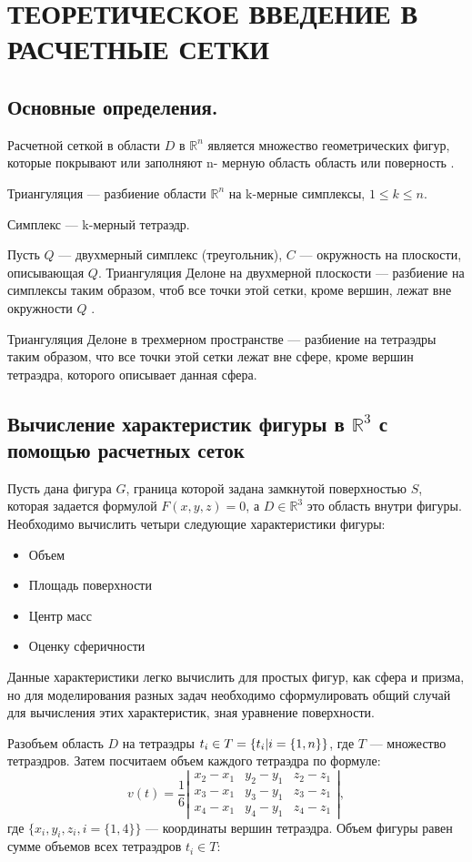 \chapter{ТЕОРЕТИЧЕСКОЕ ВВЕДЕНИЕ В РАСЧЕТНЫЕ СЕТКИ} 
\section{Основные определения.}
Расчетной сеткой в области $D$ в $\mathbb{R}^{n}$ является множество геометрических фигур, которые покрывают или заполняют n- мерную область область или поверность \cite[c.~5]{gmesh}.

Триангуляция --- разбиение области $\mathbb{R}^{n}$ на k-мерные симплексы, $1\leq k \leq n$. 

Симплекс --- k-мерный тетраэдр. 

Пусть $Q$ --- двухмерный симплекс (треугольник), $C$ --- окружность на плоскости, описывающая $Q$. Триангуляция Делоне на двухмерной плоскости --- разбиение на симплексы таким образом, чтоб все точки этой сетки, кроме вершин, лежат вне окружности $Q$ \cite[c.~2]{tetgen}.

 Триангуляция Делоне в трехмерном пространстве --- разбиение на тетраэдры таким образом, что все точки этой сетки лежат вне сфере, кроме вершин тетраэдра, которого описывает данная сфера.


\section{Вычисление характеристик фигуры в $\mathbb{R}^{3}$ с помощью расчетных сеток}
Пусть дана фигура $G$, граница которой задана замкнутой поверхностью $S$, которая задается формулой $F(x,y,z) = 0$, а $D \in \mathbb{R}^{3}$ это область внутри фигуры. Необходимо вычислить четыри следующие характеристики фигуры:
\begin{itemize}
    \item Объем
    \item Площадь поверхности
    \item Центр масс
    \item Оценку сферичности
\end{itemize}

Данные характеристики легко вычислить для простых фигур, как сфера и призма, но для моделирования разных задач необходимо сформулировать общий случай для вычисления этих характеристик, зная уравнение поверхности.

Разобъем область $D$ на тетраэдры $t_{i} \in T = \{t_{i}\arrowvert i = \{1,n\}\}$, где $T$ --- множество тетраэдров. Затем посчитаем объем каждого тетраэдра по формуле:
$$ v(t) = \frac{1}{6} \left|
\begin{array}{ccc}
        x_{2} - x_{1} & y_{2} - y_{1} & z_{2} - z_{1} \\
        x_{3} - x_{1} & y_{3} - y_{1} & z_{3} - z_{1}\\
        x_{4} - x_{1} & y_{4} - y_{1} & z_{4} - z_{1}
    \end{array} \right|,$$
    где $\{ x_{i},y_{i},z_{i}, i = \{1,4\}\}$ --- координаты вершин тетраэдра.
    Объем фигуры равен сумме объемов всех тетраэдров $t_{i} \in T$: 
    
